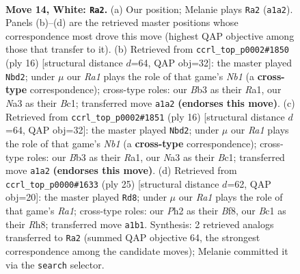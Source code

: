 \documentclass[11pt]{article}
\begin{document}
\clearpage

\begin{figure}[p]\centering
\begin{subfigure}{0.46\textwidth}\centering
\resizebox{\linewidth}{!}{%
\newchessgame
\chessboard[
  setfen={r1bqk2r/ppp1b3/nn3pp1/3p3p/P2P4/NB5N/1PP2PPP/R1BQR1K1 w kq - 4 14},
  showmover=false,
  pgfstyle=straightmove, color=movearrow, markmove={a1-a2}
]}
\caption{}
\end{subfigure}\hfill
\begin{subfigure}{0.46\textwidth}\centering
\resizebox{\linewidth}{!}{%
\newchessgame
\chessboard[
  setfen={r2qk1nr/1pp1b1pp/p1npb3/4p3/B3P3/2P2N2/PP3PPP/RNBQ1RK1 w kq - 1 9},
  showmover=false,
  pgfstyle=straightmove, color=movearrow, markmove={b1-d2}
]}
\caption{}
\end{subfigure}
\\[4pt]
\begin{subfigure}{0.46\textwidth}\centering
\resizebox{\linewidth}{!}{%
\newchessgame
\chessboard[
  setfen={r2qk1nr/1pp1b1pp/p1npb3/4p3/B3P3/2P2N2/PP3PPP/RNBQ1RK1 w kq - 1 9},
  showmover=false,
  pgfstyle=straightmove, color=movearrow, markmove={b1-d2}
]}
\caption{}
\end{subfigure}\hfill
\begin{subfigure}{0.46\textwidth}\centering
\resizebox{\linewidth}{!}{%
\newchessgame
\chessboard[
  setfen={r3kb1r/1pq1pppp/p1n2n2/4P3/5Pb1/1NN5/PP2B1PP/R1BQK2R b KQkq - 2 13},
  showmover=false,
  pgfstyle=straightmove, color=movearrow, markmove={a8-d8}
]}
\caption{}
\end{subfigure}
\caption{\textbf{Move 14, White: \texttt{Ra2}.} (a) Our position; Melanie plays \texttt{Ra2} (\texttt{a1a2}). Panels (b)--(d) are the retrieved master positions whose correspondence most drove this move (highest QAP objective among those that transfer to it). (b) Retrieved from \texttt{ccrl\_top\_p0002\#1850} (ply 16) [structural distance $d$=64, QAP obj=32]: the master played \texttt{Nbd2}; under $\mu$ our \emph{Ra1} plays the role of that game's \emph{Nb1} (a \textbf{cross-type} correspondence); cross-type roles: our \emph{B}b3 as their \emph{R}a1, our \emph{N}a3 as their \emph{B}c1; transferred move \texttt{a1a2} \textbf{(endorses this move)}. (c) Retrieved from \texttt{ccrl\_top\_p0002\#1851} (ply 16) [structural distance $d$=64, QAP obj=32]: the master played \texttt{Nbd2}; under $\mu$ our \emph{Ra1} plays the role of that game's \emph{Nb1} (a \textbf{cross-type} correspondence); cross-type roles: our \emph{B}b3 as their \emph{R}a1, our \emph{N}a3 as their \emph{B}c1; transferred move \texttt{a1a2} \textbf{(endorses this move)}. (d) Retrieved from \texttt{ccrl\_top\_p0000\#1633} (ply 25) [structural distance $d$=62, QAP obj=20]: the master played \texttt{Rd8}; under $\mu$ our \emph{Ra1} plays the role of that game's \emph{Ra1}; cross-type roles: our \emph{P}h2 as their \emph{B}f8, our \emph{B}c1 as their \emph{R}h8; transferred move \texttt{a1b1}. Synthesis: 2 retrieved analogs transferred to \texttt{Ra2} (summed QAP objective 64, the strongest correspondence among the candidate moves); Melanie committed it via the \texttt{search} selector.}
\label{fig:thought-m26}
\end{figure}
\end{document}
